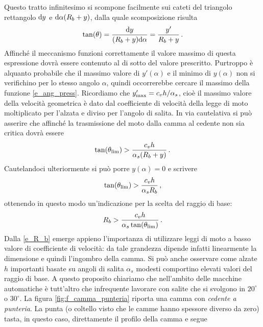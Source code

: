Questo tratto infinitesimo si scompone facilmente sui cateti 
del triangolo rettangolo
${\rm d}y$ e ${\rm d}\alpha (R_b +y)$, dalla quale scomposizione risulta
\begin{equation}
\tan(\theta)={{\rm d}y\over{(R_b+y)}{\rm d}\alpha}= {y'\over{R_b+y}}\,.
\label{e_ang_press}
\end{equation}
\noindent Affinch\'e il meccanismo funzioni correttamente il valore massimo di questa espressione dovr\`a essere contenuto al di
sotto del valore prescritto. Purtroppo \`e alquanto probabile che il massimo valore di $y'(\alpha)$ e il minimo di $y(\alpha)$ non si verifichino per lo
stesso angolo $\alpha$, quindi 
occorrerebbe cercare il massimo della funzione \ref{e_ang_press}. 
\noindent Ricordiamo che $y'_{\rm max}=c_v h/\alpha_s$, cio\`e il massimo
valore della velocit\`a geometrica \`e dato dal coefficiente di velocit\`a
della legge di moto moltiplicato per l'alzata e diviso per l'angolo di salita.
In via cautelativa si pu\`o asserire che affinch\'e la trasmissione del moto
dalla camma al cedente non sia critica dovr\`a essere 
\begin{equation}
\tan(\theta_{\rm lim})> {c_v h\over{\alpha_s(R_b+y)}}\,.
\label{e_ang_press_cv}
\end{equation}
\noindent Cautelandoci ulteriormente si pu\`o porre  $y(\alpha)=0$ e scrivere
\begin{equation}
\tan(\theta_{\rm lim})> {c_v h\over{\alpha_s R_b}}\,,
\label{e_ang_press_max}
\end{equation}
\noindent ottenendo in questo modo un'indicazione per la scelta del raggio di base:
\begin{equation}
R_b > {c_v h\over{\alpha_s \tan(\theta_{\rm lim})}}\,.
\label{e_R_b}
\end{equation}
\noindent Dalla \ref{e_R_b} emerge appieno l'importanza di utilizzare
leggi di moto a basso valore di coefficiente di velocit\`a: da tale
grandezza dipende infatti linearmente la dimensione e quindi l'ingombro della camma.
Si pu\`o anche osservare come alzate $h$ importanti
basate su angoli di salita $\alpha_s$ modesti comportino
elevati valori del raggio di base. A questo proposito chiariamo
che nell'ambito delle  macchine automatiche \`e tutt'altro che infrequente
lavorare con salite che si svolgono in $20^{\circ}$ o $30^{\circ}$. 
\noindent La figura \ref{fig:f_camma_punteria} riporta una camma con {\em cedente a
punteria}. La punta (o coltello visto che le camme hanno
spessore diverso da zero) tasta, in questo caso, direttamente il profilo della camma e segue
